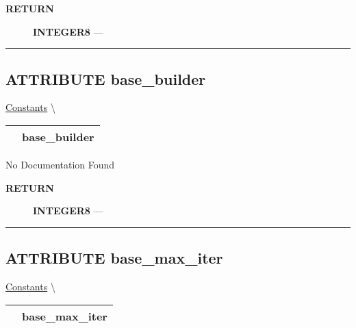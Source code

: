 \par
\begin{description}
\item [\colorbox{tagtype}{\color{white} \textbf{\textsf{RETURN}}}] \textbf{INTEGER8} --- 
\end{description}




\rule{\linewidth}{0.5pt}
\subsection*{\textsf{\colorbox{headtoc}{\color{white} ATTRIBUTE}
base\_builder}}

\hypertarget{ecldoc:logisticregression.constants.base_builder}{}
\hspace{0pt} \hyperlink{ecldoc:LogisticRegression.Constants}{Constants} \textbackslash 

{\renewcommand{\arraystretch}{1.5}
\begin{tabularx}{\textwidth}{|>{\raggedright\arraybackslash}l|X|}
\hline
\hspace{0pt}\mytexttt{\color{red} } & \textbf{base\_builder} \\
\hline
\end{tabularx}
}

\par





No Documentation Found








\par
\begin{description}
\item [\colorbox{tagtype}{\color{white} \textbf{\textsf{RETURN}}}] \textbf{INTEGER8} --- 
\end{description}




\rule{\linewidth}{0.5pt}
\subsection*{\textsf{\colorbox{headtoc}{\color{white} ATTRIBUTE}
base\_max\_iter}}

\hypertarget{ecldoc:logisticregression.constants.base_max_iter}{}
\hspace{0pt} \hyperlink{ecldoc:LogisticRegression.Constants}{Constants} \textbackslash 

{\renewcommand{\arraystretch}{1.5}
\begin{tabularx}{\textwidth}{|>{\raggedright\arraybackslash}l|X|}
\hline
\hspace{0pt}\mytexttt{\color{red} } & \textbf{base\_max\_iter} \\
\hline
\end{tabularx}
}

